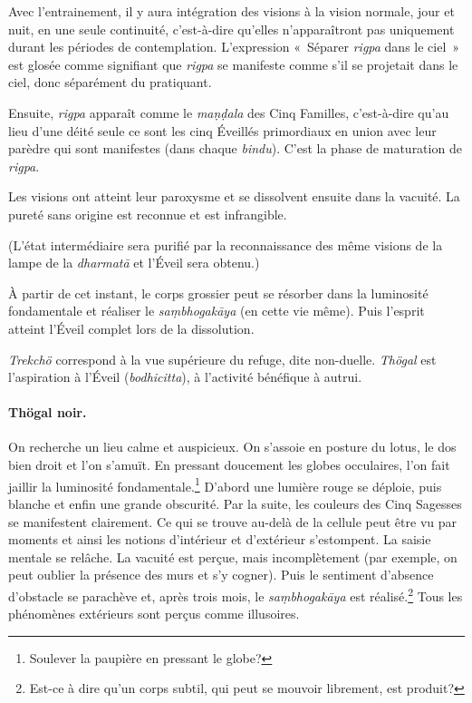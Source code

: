 \documentclass[11pt,a4paper]{article}
\begin{document}
  Avec l'entrainement, il y aura intégration des visions à la vision
  normale, jour et nuit, en une seule continuité,
  c'est\hyp{}à\hyp{}dire qu'elles n'apparaîtront pas uniquement durant
  les périodes de contemplation. L'expression «~Séparer \emph{rigpa}
    dans le ciel~» est glosée comme signifiant que \emph{rigpa} se
  manifeste comme s'il se projetait dans le ciel, donc séparément du
  pratiquant.

  Ensuite, \emph{rigpa} apparaît comme le \emph{ma\d{n}\d{d}ala} des
  Cinq Familles, c'est\hyp{}à\hyp{}dire qu'au lieu d'une déité seule
  ce sont les cinq Éveillés primordiaux en union avec leur parèdre qui
  sont manifestes (dans chaque \emph{bindu}). C'est la phase de
  maturation de \emph{rigpa}.

  Les visions ont atteint leur paroxysme et se dissolvent ensuite dans
  la vacuité. La pureté sans origine est reconnue et est infrangible.

  (L'état intermédiaire sera purifié par la reconnaissance des même
  visions de la lampe de la \emph{dharmat\=a} et l'Éveil sera obtenu.)

  À partir de cet instant, le corps grossier peut se résorber dans la
  luminosité fondamentale et réaliser le \emph{sa\d{m}bhogak\=aya} (en
  cette vie même). Puis l'esprit atteint l'Éveil complet lors de la
  dissolution.

  \emph{Trekchö} correspond à la vue supérieure du refuge, dite
  non\hyp{}duelle. \emph{Thögal} est l'aspiration à l'Éveil
  (\emph{bodhicitta}), à l'activité bénéfique à autrui.

\paragraph{Thögal noir.}

On recherche un lieu calme et auspicieux. On s'assoie en posture du
lotus, le dos bien droit et l'on s'amuït. En pressant doucement les
globes occulaires, l'on fait jaillir la luminosité
fondamentale.\footnote{Soulever la paupière en pressant le globe?}
D'abord une lumière rouge se déploie, puis blanche et enfin une grande
obscurité. Par la suite, les couleurs des Cinq Sagesses se manifestent
clairement. Ce qui se trouve au\hyp{}delà de la cellule peut être vu
par moments et ainsi les notions d'intérieur et d'extérieur
s'estompent. La saisie mentale se relâche. La vacuité est perçue, mais
incomplètement (par exemple, on peut oublier la présence des murs et
s'y cogner). Puis le sentiment d'absence d'obstacle se parachève et,
après trois mois, le \emph{sa\d{m}bhogak\=aya} est
réalisé.\footnote{Est\hyp{}ce à dire qu'un corps subtil, qui peut se
  mouvoir librement, est produit?} Tous les phénomènes extérieurs sont
perçus comme illusoires.
\end{document}
